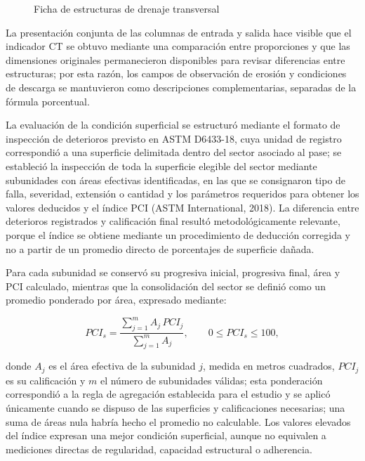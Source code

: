 \begin{figure}[p]
\centering
\caption{Ficha de estructuras de drenaje transversal}
\label{fig:ficha-transversal}
\begin{minipage}{0.95\linewidth}

\end{minipage}
\end{figure}

La presentación conjunta de las columnas de entrada y salida hace visible que el indicador CT se obtuvo mediante una comparación entre proporciones y que las dimensiones originales permanecieron disponibles para revisar diferencias entre estructuras; por esta razón, los campos de observación de erosión y condiciones de descarga se mantuvieron como descripciones complementarias, separadas de la fórmula porcentual.


La evaluación de la condición superficial se estructuró mediante el formato de inspección de deterioros previsto en ASTM D6433-18, cuya unidad de registro correspondió a una superficie delimitada dentro del sector asociado al pase; se estableció la inspección de toda la superficie elegible del sector mediante subunidades con áreas efectivas identificadas, en las que se consignaron tipo de falla, severidad, extensión o cantidad y los parámetros requeridos para obtener los valores deducidos y el índice PCI (ASTM International, 2018). La diferencia entre deterioros registrados y calificación final resultó metodológicamente relevante, porque el índice se obtiene mediante un procedimiento de deducción corregida y no a partir de un promedio directo de porcentajes de superficie dañada.

Para cada subunidad se conservó su progresiva inicial, progresiva final, área y PCI calculado, mientras que la consolidación del sector se definió como un promedio ponderado por área, expresado mediante:

\[
PCI_s=\frac{\sum_{j=1}^{m} A_j\,PCI_j}{\sum_{j=1}^{m}A_j},
\qquad 0\leq PCI_s\leq100,
\]

donde \(A_j\) es el área efectiva de la subunidad \(j\), medida en metros cuadrados, \(PCI_j\) es su calificación y \(m\) el número de subunidades válidas; esta ponderación correspondió a la regla de agregación establecida para el estudio y se aplicó únicamente cuando se dispuso de las superficies y calificaciones necesarias; una suma de áreas nula habría hecho el promedio no calculable. Los valores elevados del índice expresan una mejor condición superficial, aunque no equivalen a mediciones directas de regularidad, capacidad estructural o adherencia.

